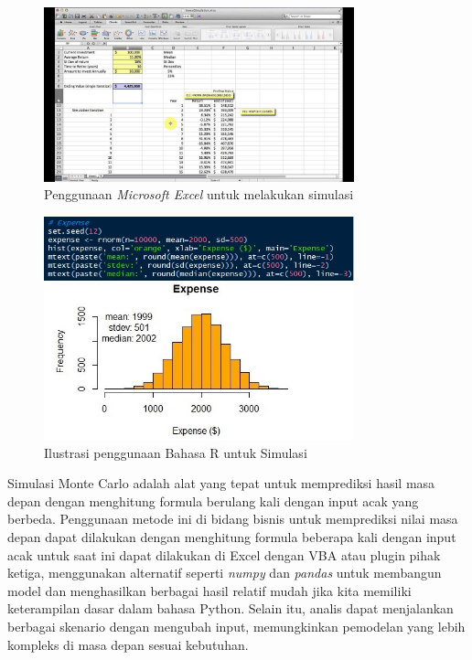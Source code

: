 \begin{figure}[h!]
    \centering
    \includegraphics[width=0.8\textwidth]{gambar/excel-carlo.jpg}
    \caption{Penggunaan \emph{Microsoft Excel} untuk melakukan simulasi \citep{Matt_Macarty_2013}}
    \label{fig:ilustrasi-Excel-Carlo}
\end{figure}

\begin{figure}[h!]
    \centering
    \includegraphics[width=0.8\textwidth]{gambar/r-carlo.jpg}
    \caption{Ilustrasi penggunaan Bahasa R untuk Simulasi \citep{Rendyk_2021}}
    \label{fig:R-monte-carlo}
\end{figure}

Simulasi Monte Carlo adalah alat yang tepat untuk memprediksi hasil masa depan dengan menghitung formula berulang kali dengan input acak yang berbeda. Penggunaan metode ini di bidang bisnis untuk memprediksi nilai masa depan dapat dilakukan dengan menghitung formula beberapa kali dengan input acak untuk saat ini dapat dilakukan di Excel dengan VBA atau plugin pihak ketiga, menggunakan alternatif seperti \emph{numpy} dan \emph{pandas} untuk membangun model dan menghasilkan berbagai hasil relatif mudah jika kita memiliki keterampilan dasar dalam bahasa Python. Selain itu, analis dapat menjalankan berbagai skenario dengan mengubah input, memungkinkan pemodelan yang lebih kompleks di masa depan sesuai kebutuhan.


